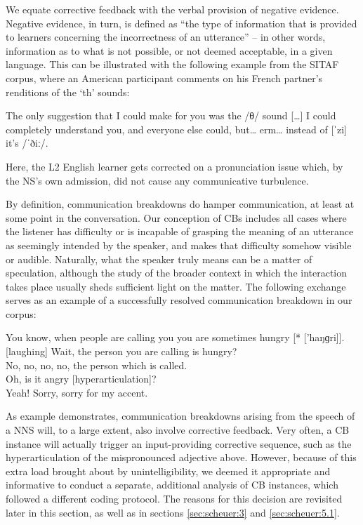 \documentclass[output=paper,colorlinks,citecolor=brown,modfonts,nonflat]{../langscibook}
\begin{document}
We equate corrective feedback with the verbal provision of negative evidence. Negative evidence, in turn, is defined as “the type of information that is provided to learners concerning the incorrectness of an utterance” \citep[225]{Gass2003} – in other words, information as to what is not possible, or not deemed acceptable, in a given language. This can be illustrated with the following example from the SITAF corpus, where an American participant comments on his French partner’s renditions of the ‘th’ sounds:


\ea\label{ex:scheuer:1}
{\NS} {The} {only} {suggestion} {that} {I} {could} {make} {for} {you} {was} {the} {/θ/} {sound} {[…]} {I} {could} {completely} {understand} {you,} {and} {everyone} {else} {could,} {but…} {erm…} {instead} {of} {[ˈzi]} {it’s} {/ˈðiː/.}
\z

Here, the L2 English learner gets corrected on a pronunciation issue which, by the NS’s own admission, did not cause any communicative turbulence.

By definition, communication breakdowns do hamper communication, at least at some point in the conversation. Our conception of CBs includes all cases where the listener has difficulty or is incapable of grasping the meaning of an utterance as seemingly intended by the speaker, and makes that difficulty somehow visible or audible. Naturally, what the speaker truly means can be a matter of speculation, although the study of the broader context in which the interaction takes place usually sheds sufficient light on the matter. The following exchange serves as an example of a successfully resolved communication breakdown in our corpus:


\ea\label{ex:scheuer:2}
{\NNS} {You} {know,} {when} {people} {are} {calling} {you} {you} {are} {sometimes} {hungry} [* ['haŋɡri]].\\
{\NS} [laughing] {Wait,} {the} {person} {you} {are} {calling} {is} {hungry?}\\
{\NNS} {No,} {no,} {no,} {no,} {the} {person} {which} {is} {called.}\\
{\NS} {Oh,} {is} {it} {angry} [hyperarticulation]?\\
{\NNS} {Yeah!} {Sorry,} {sorry} {for} {my} {accent.}
\z


As example  demonstrates, communication breakdowns arising from the speech of a NNS will, to a large extent, also involve corrective feedback. Very often, a CB instance will actually trigger an input-providing corrective sequence, such as the hyperarticulation of the mispronounced adjective above. However, because of this extra load brought about by unintelligibility, we deemed it appropriate and informative to conduct a separate, additional analysis of CB instances, which followed a different coding protocol. The reasons for this decision are revisited later in this section, as well as in sections \ref{sec:scheuer:3} and \ref{sec:scheuer:5.1}.
\end{document}
